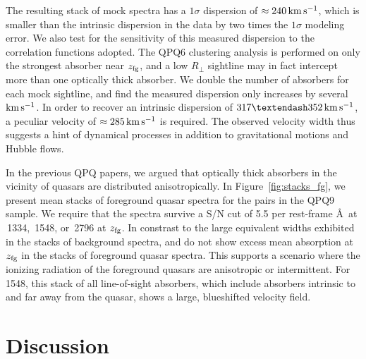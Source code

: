 \documentclass[iop]{emulateapj}
\begin{document}
The resulting stack of mock spectra has a $1\sigma$ dispersion of $\approx240\,{\rm km\,s^{-1}}$, 
which is smaller than the intrinsic dispersion in the data by two times the $1\sigma$ modeling 
error. We also test for the sensitivity of this 
measured dispersion to the correlation functions adopted. The QPQ6 clustering analysis is 
performed on only the strongest absorber near $z_{\rm fg}$, and a low $R_\perp$ sightline may in 
fact intercept more than one optically thick absorber. We double the number of absorbers for each 
mock sightline, and find the measured dispersion only increases by several ${\rm km\,s^{-1}}$. 
In order to recover an intrinsic dispersion of $317\textendash352\,{\rm km\,s^{-1}}$, a peculiar 
velocity of $\approx285\,{\rm km\,s^{-1}}$ is required. The observed velocity width thus suggests 
a hint of dynamical processes in addition to gravitational motions and Hubble flows. 

In the previous QPQ papers, we argued that optically thick absorbers in the vicinity of quasars 
are distributed anisotropically. In Figure~\ref{fig:stacks_fg}, we present mean stacks of 
foreground quasar spectra for the pairs in the QPQ9 sample. We require that the spectra survive a 
S/N cut of 5.5 per rest-frame \AA\ at \,1334, \,1548, or \,2796 at 
$z_{\rm fg}$. In constrast to the large equivalent widths exhibited in the stacks of background 
spectra,  and  do not show excess mean absorption at $z_{\rm fg}$ in the 
stacks of foreground quasar spectra. This supports a scenario where the ionizing radiation of the 
foreground quasars are anisotropic or intermittent. For \,1548, this stack of all 
line-of-sight absorbers, which include absorbers intrinsic to and far away from the quasar, shows 
a large, blueshifted velocity field. 

\section{Discussion}
\label{sec:discussion}
\end{document}
